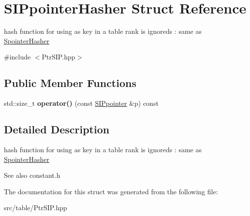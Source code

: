 \hypertarget{structSIPpointerHasher}{}\section{S\+I\+Ppointer\+Hasher Struct Reference}
\label{structSIPpointerHasher}


hash function for using as key in a table rank is ignoreds \+: same as \mbox{\hyperlink{structSpointerHasher}{Spointer\+Hasher}}  




{\ttfamily \#include $<$Ptr\+S\+I\+P.\+hpp$>$}

\subsection*{Public Member Functions}
\begin{DoxyCompactItemize}
\item 
\mbox{\label{structSIPpointerHasher_a089b7f539ef0e7db325062242ee29fa0}} 
std\+::size\+\_\+t {\bfseries operator()} (const \mbox{\hyperlink{classSIPpointer}{S\+I\+Ppointer}} \&p) const
\end{DoxyCompactItemize}


\subsection{Detailed Description}
hash function for using as key in a table rank is ignoreds \+: same as \mbox{\hyperlink{structSpointerHasher}{Spointer\+Hasher}} 

\begin{DoxySeeAlso}{See also}
constant.\+h 
\end{DoxySeeAlso}


The documentation for this struct was generated from the following file\+:\begin{DoxyCompactItemize}
\item 
src/table/Ptr\+S\+I\+P.\+hpp\end{DoxyCompactItemize}
